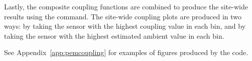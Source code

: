 Lastly, the composite coupling functions are combined to produce the site-wide results using the  command.
The site-wide coupling plots are produced in two ways: by taking the sensor with the highest coupling value in each bin, and by taking the sensor with the highest estimated ambient value in each bin.

See Appendix~\ref{app:pemcoupling} for examples of figures produced by the \pemcoupling code.
